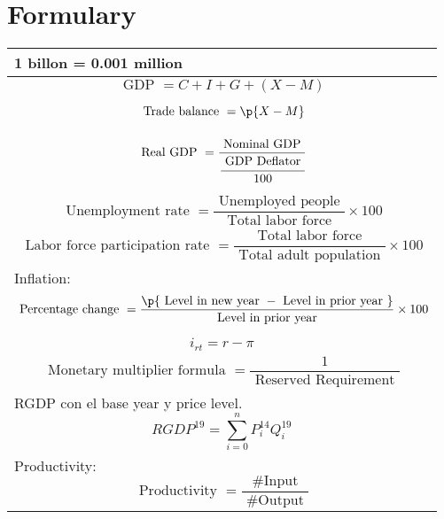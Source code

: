 \documentclass[openany]{book}
\begin{document}
\chapter{Formulary}
\begin{center}
    \begin{tabular}{ |p{16cm}| }
        \hline
            1 billon = 0.001 million \\ 
        \hline
            \[
                \text{ GDP } = C + I + G + (X-M)
            \] \\
        \hline
            \[
                \text{ Trade balance } = \p{X - M} 
            \] \\
        \hline
            \[
                \text{ Real GDP } = \frac{\text{ Nominal GDP }}{\cfrac{\text{ GDP Deflator }}{100}} 
            \] \\
        \hline
            \[
                \text{ Unemployment rate } = \frac{\text{ Unemployed people }}{\text{ Total labor force }} \times 100 
            \] \\
        \hline
            \[
                \text{ Labor force participation rate } = \frac{\text{ Total labor force }}{\text{ Total adult population }} \times 100
            \] \\
        \hline
        Inflation: 
            \[
                \text{ Percentage change } = \frac{\p{\text{ Level in new year } - \text{ Level in prior year }} }{\text{ Level in prior year }} \times 100
            \] \\
        \hline
            \[ 
                i_{rt} = r - \pi  
            \] \\ 
        \hline
        \[
            \text{ Monetary multiplier formula } = \frac{1}{\text{ Reserved Requirement }} 
        \] \\
        \hline
        RGDP con el base year y price level. 
        \[
          RGDP^{19} = \sum_{i=0}^{n}P_{i}^{14} Q_{i}^{19}
        \] \\ 
        \hline 
        Productivity:  
        \[
            \text{ Productivity } = \frac{\text{ \#Input }}{\text{ \#Output }} 
        \] \\ 
        \hline
    \end{tabular}
\end{center}





\end{document}
